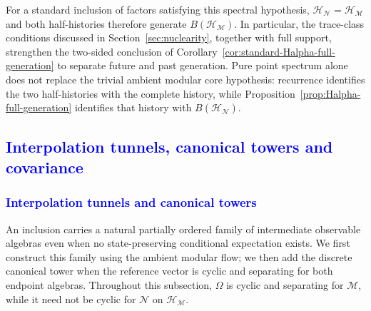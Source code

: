 \documentclass[a4paper,11pt]{article}
\theoremstyle{definition}
\newcommand{\mN}{\mathcal{N}}
\newcommand{\mH}{\mathcal{H}}
\newcommand{\mM}{\mathcal{M}}
\newcommand{\NL}[1]{\textcolor{blue}{#1}}
\begin{document}
For a standard inclusion of factors satisfying this spectral hypothesis,
$\mH_{\mN}=\mH_{\mM}$ and both half-histories therefore generate
$B(\mH_{\mM})$. In particular, the trace-class conditions discussed in
Section~\ref{sec:nuclearity}, together with full support, strengthen the
two-sided conclusion of Corollary~\ref{cor:standard-Halpha-full-generation}
to separate future and past generation. Pure point spectrum alone
does not replace the trivial ambient modular core hypothesis: recurrence
identifies the two half-histories with the complete history, while
Proposition~\ref{prop:Halpha-full-generation} identifies that history
with $B(\mH_{\mN})$.

\subsection{\NL{Interpolation tunnels, canonical towers and covariance}}
\label{subsec:Q-tower-covariance}

\subsubsection{\NL{Interpolation tunnels and canonical towers}}
\label{subsec:interpolation-tunnel}

An inclusion carries a natural partially ordered family of intermediate
observable algebras even when no state-preserving conditional expectation
exists. We first construct this family using the ambient modular flow;
we then add the discrete canonical tower when the reference vector is
cyclic and separating for both endpoint algebras. Throughout this
subsection, $\Omega$ is cyclic and separating for $\mM$, while it need
not be cyclic for $\mN$ on $\mH_{\mM}$.
\end{document}
